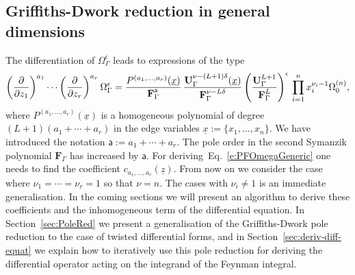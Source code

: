 \documentclass[a4paper,12pt]{article}
\numberwithin{equation}{section}
\numberwithin{figure}{section}
\begin{document}
\subsection{Griffiths-Dwork reduction in general dimensions}\label{sec:griff-dwork-reduct}
The    differentiation of $\Omega_\Gamma^\epsilon$ 
leads  to  expressions of the type 
\begin{equation}\label{e:PDE}
\left(\partial\over \partial z_1\right)^{a_1}\cdots\left(\partial
  \over\partial z_r\right)^{a_r} \Omega_\Gamma^\epsilon=
{  P^{(a_1,\dots,a_r)}(\underline x)\over \textbf{F}_\Gamma^{\mathsf {a}}}\, { \textbf{U}_\Gamma^{\nu-(L+1)\delta} (\underline x)\over \textbf{F}_\Gamma^{\nu-L\delta}}
  \left(\textbf{U}_\Gamma^{L+1}\over \textbf{F}_\Gamma^L\right)^{\epsilon} \, \prod_{i=1}^n x_i^{\nu_i-1} \Omega^{(n)}_0  ,
\end{equation}
where 
$  P^{(a_1,\dots,a_r)}(\underline x)$ is a
  homogeneous polynomial of degree $(L+1)(a_1+\cdots+a_r)$ in
 the edge variables $\underline x:=\{x_1,\dots, x_n\}$.
 We have introduced the notation $\mathsf{a}:=a_1+\cdots +a_r$. 
The
  pole order in the second Symanzik polynomial $\textbf{F}_\Gamma$ has increased by
  $\mathsf a$. 
  For deriving~Eq.~\eqref{e:PFOmegaGeneric} one needs to find the
  coefficient $c_{a_1,\dots, a_r}(\underline z)$.  From now on we consider the case where
  $\nu_1=\cdots=\nu_r=1$ so that $\nu=n$. The cases with $\nu_i\neq1$
  is an immediate generalisation. 
  In the coming sections we will present an algorithm to derive these
  coefficients and the inhomogeneous term of the differential
  equation. In Section~\ref{sec:PoleRed} we present a generalisation of the Griffiths-Dwork
  pole reduction to the case of twisted differential forms, and in
  Section~\ref{sec:deriv-diff-equat} we explain how to iteratively use this pole reduction for
  deriving the differential operator acting on the integrand of the
  Feynman integral.

\end{document}
